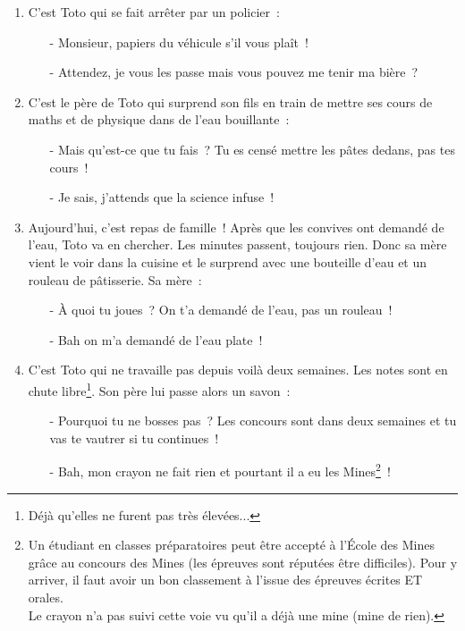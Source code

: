 \documentclass[10pt,a5paper,fullpage]{book}
\begin{document}
\begin{enumerate}
		\item C’est Toto qui se fait arrêter par un policier~:
		\begin{itemize}
			\item[-] Monsieur, papiers du véhicule s'il vous plaît~!
			\item[-] Attendez, je vous les passe mais vous pouvez me tenir ma bière~?
		\end{itemize}
		
		\item C’est le père de Toto qui surprend son fils en train de mettre ses cours de maths et de physique dans de l’eau bouillante~:
		\begin{itemize}
			\item[-] Mais qu’est-ce que tu fais~? Tu es censé mettre les pâtes dedans, pas tes cours~!
			\item[-] Je sais, j’attends que la science infuse~!
		\end{itemize}
		
		\item Aujourd’hui, c’est repas de famille~! Après que les convives ont demandé de l’eau, Toto va en chercher. Les minutes passent, toujours rien. Donc sa mère vient le voir dans la cuisine et le surprend avec une bouteille d’eau et un rouleau de pâtisserie. Sa mère~:  
		\begin{itemize}
			\item[-] À quoi tu joues~? On t'a demandé de l'eau, pas un rouleau~!
			\item[-] Bah on m’a demandé de l’eau plate~!
		\end{itemize}
		
		\item C’est Toto qui ne travaille pas depuis voilà deux semaines. Les notes sont en chute libre\footnote{Déjà qu'elles ne furent pas très élevées...}. Son père lui passe alors un savon~:
		\begin{itemize}
			\item[-] Pourquoi tu ne bosses pas~? Les concours sont dans deux semaines et tu vas te vautrer si tu continues~!
			\item[-] Bah, mon crayon ne fait rien et pourtant il a eu les Mines\footnote{Un étudiant en classes préparatoires peut être accepté à l'École des Mines grâce au concours des Mines (les épreuves sont réputées être difficiles). Pour y arriver, il faut avoir un bon classement à l'issue des épreuves écrites ET orales. \\Le crayon n'a pas suivi cette voie vu qu'il a déjà une mine (mine de rien).}~!
		\end{itemize}
		

\end{enumerate}
\end{document}
